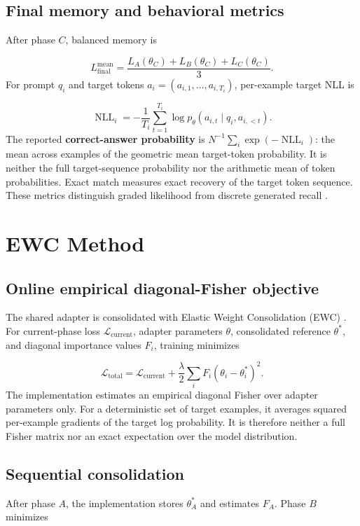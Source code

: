 \documentclass[12pt,a4paper]{article}
\begin{document}
\subsection{Final memory and behavioral metrics}
After phase \(C\), balanced memory is

\[
L_{\mathrm{final}}^{\mathrm{mean}}=\frac{L_A(\theta_C)+L_B(\theta_C)+L_C(\theta_C)}{3}.
\]
For prompt \(q_i\) and target tokens \(a_i=(a_{i,1},\ldots,a_{i,T_i})\), per-example target NLL is

\[
\operatorname{NLL}_i=-\frac{1}{T_i}\sum_{t=1}^{T_i}\log p_\theta(a_{i,t}\mid q_i,a_{i,<t}).
\]
The reported \textbf{correct-answer probability} is \(N^{-1}\sum_i\exp(-\operatorname{NLL}_i)\): the mean across examples of the geometric mean target-token probability. It is neither the full target-sequence probability nor the arithmetic mean of token probabilities. Exact match measures exact recovery of the target token sequence. These metrics distinguish graded likelihood from discrete generated recall \cite{ref9,ref10,ref13}.

\section{EWC Method}
\subsection{Online empirical diagonal-Fisher objective}
The shared adapter is consolidated with Elastic Weight Consolidation (EWC) \cite{ref1}. For current-phase loss \(\mathcal L_{\mathrm{current}}\), adapter parameters \(\theta\), consolidated reference \(\theta^\ast\), and diagonal importance values \(F_i\), training minimizes

\[
\mathcal L_{\mathrm{total}}
=
\mathcal L_{\mathrm{current}}
+
\frac{\lambda}{2}
\sum_i F_i(\theta_i-\theta_i^\ast)^2.
\]
The implementation estimates an empirical diagonal Fisher over adapter parameters only. For a deterministic set of target examples, it averages squared per-example gradients of the target log probability. It is therefore neither a full Fisher matrix nor an exact expectation over the model distribution.

\subsection{Sequential consolidation}
After phase \(A\), the implementation stores \(\theta_A^\ast\) and estimates \(F_A\). Phase \(B\) minimizes
\end{document}
